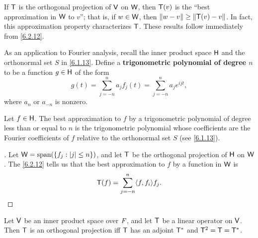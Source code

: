 \begin{note}
  If \(\mathsf{T}\) is the orthogonal projection of \(\mathsf{V}\) on \(\mathsf{W}\), then \(\mathsf{T}(v)\) is the ``best approximation in \(\mathsf{W}\) to \(v\)'';
  that is, if \(w \in \mathsf{W}\), then \(\left\lVert w - v\right\rVert \geq \left\lVert\mathsf{T}(v) - v\right\rVert\).
  In fact, this approximation property characterizes \(\mathsf{T}\).
  These results follow immediately from \cref{6.2.12}.
\end{note}

\begin{defn}\label{6.6.3}
  As an application to Fourier analysis, recall the inner product space \(\mathsf{H}\) and the orthonormal set \(S\) in \cref{6.1.13}.
  Define a \textbf{trigonometric polynomial of degree \(n\)} to be a function \(g \in \mathsf{H}\) of the form
  \[
    g(t) = \sum_{j = -n}^n a_j f_j(t) = \sum_{j = -n}^n a_j e^{i j t},
  \]
  where \(a_n\) or \(a_{-n}\) is nonzero.
\end{defn}

\begin{prop}\label{6.6.4}
  Let \(f \in \mathsf{H}\).
  The best approximation to \(f\) by a trigonometric polynomial of degree less than or equal to \(n\) is the trigonometric polynomial whose coefficients are the Fourier coefficients of \(f\) relative to the orthonormal set \(S\) (see \cref{6.1.13}).
\end{prop}

\begin{proof}[]
  Let \(\W = \spn{\set{f_j : \abs{j} \leq n}}\), and let \(\mathsf{T}\) be the orthogonal projection of \(\mathsf{H}\) on \(\mathsf{W}\).
  The \cref{6.2.12} tells us that the best approximation to \(f\) by a function in \(\mathsf{W}\) is
  \[
    \T(f) = \sum_{j = -n}^n \inn{f, f_i} f_j.
  \]
\end{proof}

\begin{thm}\label{6.24}
  Let \(\mathsf{V}\) be an inner product space over \(\mathit{F}\), and let \(\mathsf{T}\) be a linear operator on \(\mathsf{V}\).
  Then \(\mathsf{T}\) is an orthogonal projection iff \(\mathsf{T}\) has an adjoint \(\mathsf{T}^*\) and \(\mathsf{T}^2 = \mathsf{T} = \mathsf{T}^*\).
\end{thm}

